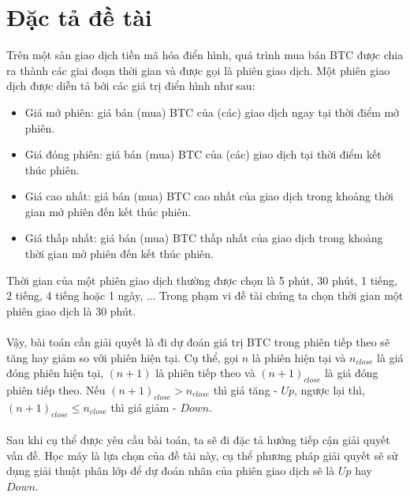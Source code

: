 \section{Đặc tả đề tài}
Trên một sàn giao dịch tiền mã hóa điển hình, quá trình mua bán BTC được chia ra 
thành các giai đoạn thời gian và được gọi là phiên giao dịch. Một phiên giao dịch 
được diễn tả bởi các giá trị điển hình như sau:
\begin{itemize}
\item Giá mở phiên: giá bán (mua) BTC của (các) giao dịch ngay tại thời 
điểm mở phiên.
\item Giá đóng phiên: giá bán (mua) BTC của (các) giao dịch tại thời điểm 
kết thúc phiên.
\item Giá cao nhất: giá bán (mua) BTC cao nhất của giao dịch trong khoảng 
thời gian mở phiên đến kết thúc phiên.
\item Giá thấp nhất: giá bán (mua) BTC thấp nhất của giao dịch trong khoảng 
thời gian mở phiên đến kết thúc phiên.
\end{itemize}
Thời gian của một phiên giao dịch thường được chọn là 5 phút, 30 phút, 1 tiếng, 2 tiếng, 
4 tiếng hoặc 1 ngày, ... 
Trong phạm vi đề tài chúng ta chọn thời gian một phiên giao dịch là 30 phút.\\\\
Vậy, bài toán cần giải quyết là đi dự đoán giá trị BTC trong phiên tiếp theo sẽ tăng 
hay giảm so với phiên hiện tại. Cụ thể, gọi $n$ là phiên hiện tại và $n_{close}$ 
là giá đóng phiên hiện tại, $(n+1)$ là phiên tiếp theo và $(n+1)_{close}$ là giá đóng 
phiên tiếp theo. Nếu $(n+1)_{close} > n_{close}$ thì giá tăng - $Up$, ngược lại thì, 
$(n+1)_{close} \leq n_{close}$ thì giá giảm - $Down$.\\\\
Sau khi cụ thể được yêu cầu bài toán, ta sẽ đi đặc tả hướng tiếp cận giải quyết 
vấn đề. Học máy là lựa chọn của đề tài này, cụ thể phương pháp giải quyết 
sẽ sử dụng giải thuật phân lớp để dự đoán nhãn của phiên giao dịch sẽ là $Up$ 
hay $Down$.

